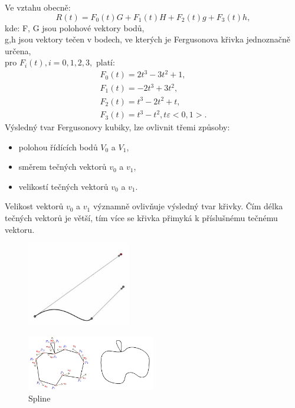 Ve vztahu obecně: \\
\begin{equation*} 
R(t) = F_{0}(t) G + F_{1}(t) H + F_{2}(t) g + F_{3}(t) h,
\end{equation*}
kde: F, G jsou polohové vektory bodů,\\ g,h jsou vektory tečen v bodech, ve kterých je Fergusonova křivka jednoznačně určena,\\
pro $F_{i}(t), i = 0, 1, 2, 3,$ platí: \\
\begin{equation*} 
\begin{array}{c}
F_{0}(t) = 2 t^{3} - 3t^{2} + 1, \\
F_{1}(t) = -2t^{3} + 3t^{2}, \\
F_{2}(t) = t^{3} - 2t^{2} + t, \\
F_{3}(t) = t^{3} - t^{2},  t \varepsilon <0, 1>.
\end{array}
\end{equation*}
Výsledný tvar Fergusonovy kubiky, lze ovlivnit třemi způsoby:
\begin{itemize}
	\item polohou řídících bodů $V_0$ a $V_1$,
	\item směrem tečných vektorů $v_0$ a $v_1$,
	\item velikostí tečných vektorů $v_0$ a $v_1$.
\end{itemize}
Velikost vektorů $v_0$ a $v_1$ významně ovlivňuje výsledný tvar křivky. Čím délka tečných vektorů je větší, tím více se křivka přimyká k příslušnému tečnému vektoru.
\begin{figure}[H]
\centering
\includegraphics[width=0.4\textwidth]{assets/3_ferg_krivka}
\end{figure}
\begin{figure}[H]
\centering
\includegraphics[width=0.5\textwidth]{assets/3_ferg_spline}
\caption{Spline}
\end{figure}


